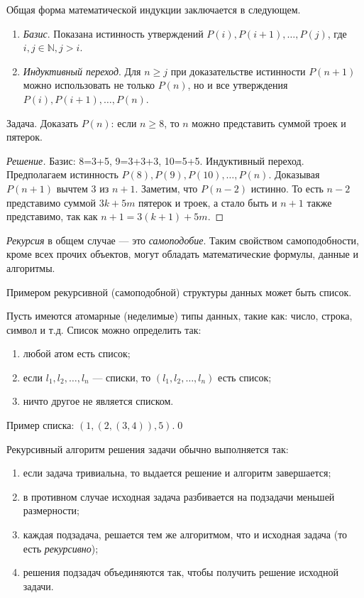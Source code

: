Общая форма математической индукции заключается в следующем.
\begin{enumerate}
    \item \emph{Базис}. Показана истинность утверждений $P(i),P(i+1),\ldots,P(j)$, где $i,j\in\mathbb{N},j>i$.
    \item \emph{Индуктивный переход}. Для $n\geq j$ при доказательстве истинности $P(n+1)$ можно использовать не только $P(n)$, но и все утверждения $P(i),P(i+1),\ldots,P(n)$.
\end{enumerate}

\begin{exampl} 
    Задача. Доказать $P(n)$: если $n\geq 8$, то $n$ можно представить суммой троек и пятерок.
\end{exampl}
\begin{proof}[Решение]
    Базис: 8=3+5, 9=3+3+3, 10=5+5. Индуктивный переход. Предполагаем истинность $P(8),P(9),P(10),\ldots,P(n)$. Доказывая $P(n+1)$ вычтем $3$ из $n+1$. Заметим, что $P(n-2)$ истинно. То есть $n-2$ представимо суммой $3k+5m$ пятерок и троек, а стало быть и $n+1$ также представимо, так как $n+1=3(k+1)+5m$.
\end{proof}

\emph{Рекурсия} в общем случае --- это \emph{самоподобие}. Таким свойством самоподобности, кроме всех прочих объектов, могут обладать математические формулы, данные и алгоритмы. 

Примером рекурсивной (самоподобной) структуры данных может быть список.
\begin{exampl} 
    Пусть имеются атомарные (неделимые) типы данных, такие как: число, строка, символ и т.д. Список можно определить так:
    \begin{enumerate}
        \item любой атом есть список;
        \item если $l_1,l_2,\ldots,l_n$ --- списки, то $(l_1,l_2,\ldots,l_n)$ есть список;
        \item ничто другое не является списком.
    \end{enumerate}
    
    Пример списка: $(1,(2,(3,4)),5)$.\qed
\end{exampl}

Рекурсивный алгоритм решения задачи обычно выполняется так:
\begin{enumerate}
    \item если задача тривиальна, то выдается решение и алгоритм завершается;
    \item в противном случае исходная задача разбивается на подзадачи меньшей размерности;
    \item каждая подзадача, решается тем же алгоритмом, что и исходная задача (то есть \emph{рекурсивно});
    \item решения подзадач объединяются так, чтобы получить решение исходной задачи.
\end{enumerate}

